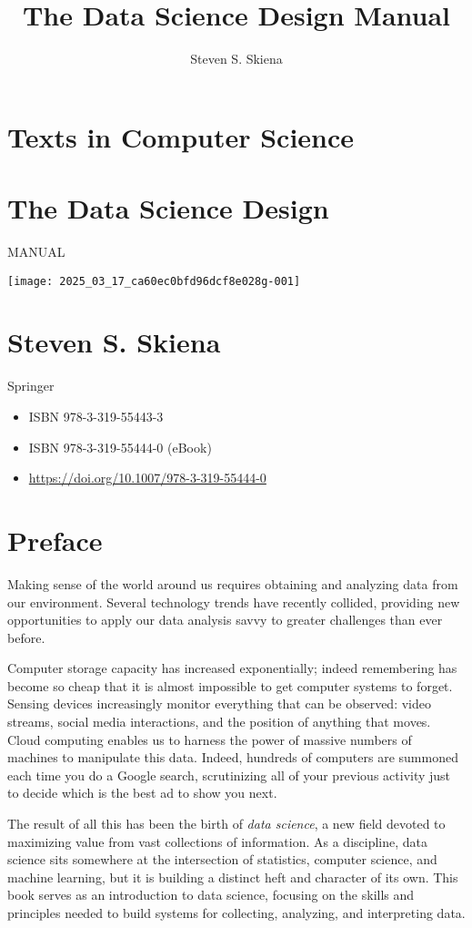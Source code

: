 \documentclass[10pt]{article}
\title{The Data Science Design Manual}
\author{Steven S. Skiena}
\date{}
\begin{document}
\maketitle

\section*{Texts in Computer Science}
\section*{The Data Science Design}
MANUAL
\begin{center}
\texttt{[image: 2025\_03\_17\_ca60ec0bfd96dcf8e028g-001]}
\end{center}

\section*{Steven S. Skiena}
Springer
\begin{itemize}
\item ISBN 978-3-319-55443-3
\item ISBN 978-3-319-55444-0 (eBook)
\item \href{https://doi.org/10.1007/978-3-319-55444-0}{https://doi.org/10.1007/978-3-319-55444-0}
\end{itemize}

\section*{Preface}
Making sense of the world around us requires obtaining and analyzing data from our environment. Several technology trends have recently collided, providing new opportunities to apply our data analysis savvy to greater challenges than ever before.

Computer storage capacity has increased exponentially; indeed remembering has become so cheap that it is almost impossible to get computer systems to forget. Sensing devices increasingly monitor everything that can be observed: video streams, social media interactions, and the position of anything that moves. Cloud computing enables us to harness the power of massive numbers of machines to manipulate this data. Indeed, hundreds of computers are summoned each time you do a Google search, scrutinizing all of your previous activity just to decide which is the best ad to show you next.

The result of all this has been the birth of \textit{data science}, a new field devoted to maximizing value from vast collections of information. As a discipline, data science sits somewhere at the intersection of statistics, computer science, and machine learning, but it is building a distinct heft and character of its own. This book serves as an introduction to data science, focusing on the skills and principles needed to build systems for collecting, analyzing, and interpreting data.
\end{document}

